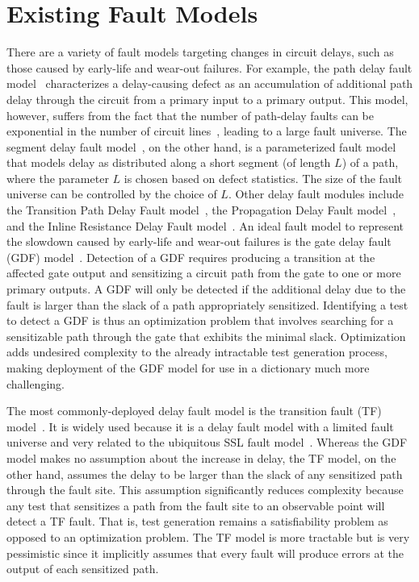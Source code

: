 \section{Existing Fault Models}
\label{sec:trax_existing_fault_models}

There are a variety of fault models targeting changes in circuit delays, such as those caused by early-life and wear-out failures.
%
For example, the path delay fault model~\cite{smith85,lin87} characterizes a delay-causing defect as an accumulation of additional path delay through the circuit from a primary input to a primary output.
%
This model, however, suffers from the fact that the number of path-delay faults can be exponential in the number of circuit lines~\cite{heragu96}, leading to a large fault universe.
%
The segment delay fault model~\cite{heragu96}, on the other hand, is a parameterized fault model that models delay as distributed along a short segment (of length $L$) of a path, where the parameter $L$ is chosen based on defect statistics.
%
The size of the fault universe can be controlled by the choice of $L$.
%
Other delay fault modules include the Transition Path Delay Fault model~\cite{pomeranz08tpdf}, the Propagation Delay Fault model~\cite{lin05}, and the Inline Resistance Delay Fault model~\cite{benware04}.
%
An ideal fault model to represent the slowdown caused by early-life and wear-out failures is the gate delay fault (GDF) model~\cite{jha03}.
%
Detection of a GDF requires producing a transition at the affected gate output and sensitizing a circuit path from the gate to one or more primary outputs.
%
A GDF will only be detected if the additional delay due to the fault is larger than the slack of a path appropriately sensitized.
%
Identifying a test to detect a GDF is thus an optimization problem that involves searching for a sensitizable path through the gate that exhibits the minimal slack.
%
Optimization adds undesired complexity to the already intractable test generation process, making deployment of the GDF model for use in a dictionary much more challenging.

The most commonly-deployed delay fault model is the transition fault (TF) model~\cite{jha03}.
%
It is widely used because it is a delay fault model with a limited fault universe and very related to the ubiquitous SSL fault model~\cite{wang14}.
%
Whereas the GDF model makes no assumption about the increase in delay, the TF model, on the other hand, assumes the delay to be larger than the slack of any sensitized path through the fault site.
%
This assumption significantly reduces complexity because any test that sensitizes a path from the fault site to an observable point will detect a TF fault.
%
That is, test generation remains a satisfiability problem as opposed to an optimization problem.
%
The TF model is more tractable but is very pessimistic since it implicitly assumes that every fault will produce errors at the output of each sensitized path.%

